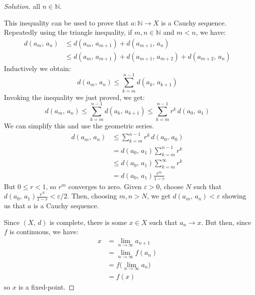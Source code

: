 \documentclass{article}
\theoremstyle{normal}
\begin{document}
\begin{proof}[Solution]
        all $n\in\mathbb{N}$.
        \par\hfill\par
        This inequality can be used to prove that $a:\mathbb{N}\rightarrow{X}$
        is a Cauchy sequence. Repeatedly using the triangle inequality,
        if $m,n\in\mathbb{N}$ and $m<n$, we have:
        \begin{align}
            d(a_{m},\,a_{n})
            &\leq{d}(a_{m},\,a_{m+1})+d(a_{m+1},\,a_{n})\\
            &\leq{d}(a_{m},\,a_{m+1})+d(a_{m+1},\,a_{m+2})+d(a_{m+2},\,a_{n})
        \end{align}
        Inductively we obtain:
        \begin{equation}
            d(a_{m},\,a_{n})
            \leq\sum_{k=m}^{n-1}d(a_{k},\,a_{k+1})
        \end{equation}
        Invoking the inequality we just proved, we get:
        \begin{equation}
            d(a_{m},\,a_{n})
            \leq\sum_{k=m}^{n-1}d(a_{k},\,a_{k+1})
            \leq\sum_{k=m}^{n-1}r^{k}\,d(a_{0},\,a_{1})
        \end{equation}
        We can simplify this and use the geometric series.
        \begin{align}
            d(a_{m},\,a_{n})
            &\leq\sum_{k=m}^{n-1}r^{k}\,d(a_{0},\,a_{0})\\
            &=d(a_{0},\,a_{1})\sum_{k=m}^{n-1}r^{k}\\
            &\leq{d}(a_{0},\,a_{1})\sum_{k=m}^{\infty}r^{k}\\
            &=d(a_{0},\,a_{1})\frac{r^{m}}{1-r}
        \end{align}
        But $0\leq{r}<1$, so $r^{m}$ converges to zero. Given
        $\varepsilon>0$, choose $N$ such that
        $d(a_{0},\,a_{1})\frac{r^{N}}{1-r}<\varepsilon/2$. Then, choosing
        $m,n>N$, we get $d(a_{m},\,a_{n})<\varepsilon$ showing us that
        $a$ is a Cauchy sequence.
        \par\hfill\par
        Since $(X,\,d)$ is complete, there is some $x\in{X}$ such that
        $a_{n}\rightarrow{x}$. But then, since $f$ is continuous, we have:
        \begin{align}
            x&=\lim_{n\rightarrow\infty}a_{n+1}\\
            &=\lim_{n\rightarrow\infty}f(a_{n})\\
            &=f\big(\lim_{n\rightarrow\infty}a_{n}\big)\\
            &=f(x)
        \end{align}
        so $x$ is a fixed-point.
    \end{proof}
\end{document}
